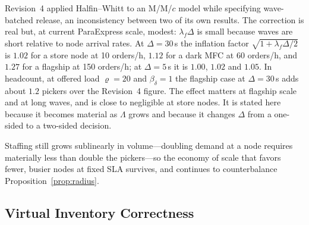 \begin{remark}
Revision~4 applied Halfin--Whitt to an M/M/$c$ model while specifying wave-batched release, an inconsistency between two of its own results. The correction is real but, at current ParaExpress scale, modest: $\lambda_f\Delta$ is small because waves are short relative to node arrival rates. At $\Delta=30$\,s the inflation factor $\sqrt{1+\lambda_f\Delta/2}$ is $1.02$ for a store node at 10 orders/h, $1.12$ for a dark MFC at 60 orders/h, and $1.27$ for a flagship at 150 orders/h; at $\Delta=5$\,s it is $1.00$, $1.02$ and $1.05$. In headcount, at offered load $\varrho=20$ and $\beta_\delta=1$ the flagship case at $\Delta=30$\,s adds about $1.2$ pickers over the Revision~4 figure. The effect matters at flagship scale and at long waves, and is close to negligible at store nodes. It is stated here because it becomes material as $\Lambda$ grows and because it changes $\Delta$ from a one-sided to a two-sided decision.

Staffing still grows sublinearly in volume---doubling demand at a node requires materially less than double the pickers---so the economy of scale that favors fewer, busier nodes at fixed SLA survives, and continues to counterbalance Proposition~\ref{prop:radius}.
\end{remark}

\subsection{Virtual Inventory Correctness}

